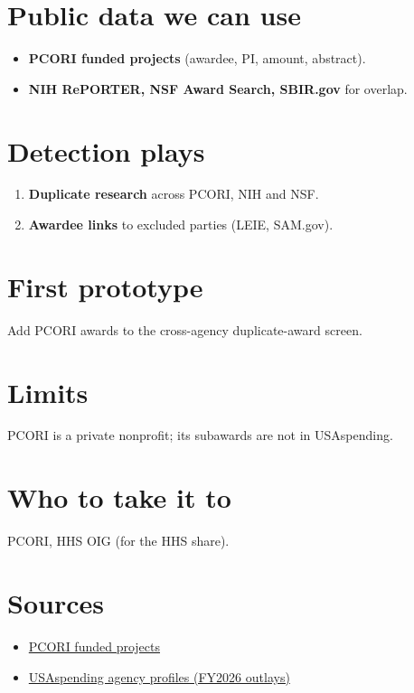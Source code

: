 \documentclass[letterpaper,11pt]{article}
\providecommand{\tightlist}{\setlength{\itemsep}{0pt}\setlength{\parskip}{0pt}}
\begin{document}
\hypertarget{public-data-we-can-use}{%
\section{Public data we can use}\label{public-data-we-can-use}}

\begin{itemize}
\tightlist
\item
  \textbf{PCORI funded projects} (awardee, PI, amount, abstract).
\item
  \textbf{NIH RePORTER, NSF Award Search, SBIR.gov} for overlap.
\end{itemize}

\hypertarget{detection-plays}{%
\section{Detection plays}\label{detection-plays}}

\begin{enumerate}
\def\labelenumi{\arabic{enumi}.}
\tightlist
\item
  \textbf{Duplicate research} across PCORI, NIH and NSF.
\item
  \textbf{Awardee links} to excluded parties (LEIE, SAM.gov).
\end{enumerate}

\hypertarget{first-prototype}{%
\section{First prototype}\label{first-prototype}}

Add PCORI awards to the cross-agency duplicate-award screen.

\hypertarget{limits}{%
\section{Limits}\label{limits}}

PCORI is a private nonprofit; its subawards are not in USAspending.

\hypertarget{who-to-take-it-to}{%
\section{Who to take it to}\label{who-to-take-it-to}}

PCORI, HHS OIG (for the HHS share).

\hypertarget{sources}{%
\section{Sources}\label{sources}}

\begin{itemize}
\tightlist
\item
  \href{https://www.pcori.org/research/explore-our-portfolio}{PCORI
  funded projects}
\item
  \href{https://www.usaspending.gov/agency}{USAspending agency profiles
  (FY2026 outlays)}
\end{itemize}
\end{document}
